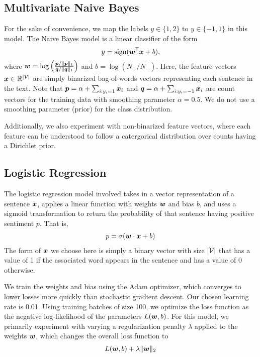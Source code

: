 \documentclass[11pt]{article}
\begin{document}
\subsection{Multivariate Naive Bayes}
For the sake of convenience, we map the labels $y\in\{1, 2\}$ to $y\in\{-1, 1\}$ in this model. The Naive Bayes model is a linear classifier of the form
\[
y = \text{sign}(\boldsymbol{w}^{\mathsf{T}} \boldsymbol{x} + b),
\]
where $\boldsymbol{w} = \log\left(\frac{\boldsymbol{p} / \lVert\boldsymbol{p}\rVert_1}{\boldsymbol{q} / \lVert\boldsymbol{q}\rVert_1}\right)$ and $b = \log(N_+ / N_-)$. Here, the feature vectors $\boldsymbol{x}\in\mathbb{R}^{\lvert \mathcal{V}\rvert}$ are simply binarized bag-of-words vectors representing each sentence in the text. Note that $\boldsymbol{p} = \alpha + \sum_{i: y_i = 1} \boldsymbol{x}_i$ and $\boldsymbol{q} = \alpha + \sum_{i: y_i = -1} \boldsymbol{x}_i$ are count vectors for the training data with smoothing parameter $\alpha = 0.5$. We do not use a smoothing parameter (prior) for the class distribution.

Additionally, we also experiment with non-binarized feature vectors, where each feature can be understood to follow a catergorical distribution over counts having a Dirichlet prior.

\subsection{Logistic Regression}
The logistic regression model involved takes in a vector representation of a sentence $\boldsymbol{x}$, applies a linear function with weights $\boldsymbol{w}$ and bias $b$, and uses a sigmoid transformation to return the probability of that sentence having positive sentiment $p$.  That is,
\begin{align*}
p = \sigma(\boldsymbol{w} \cdot \boldsymbol{x} + b)
\end{align*}
The form of $\boldsymbol{x}$ we choose here is simply a binary vector with size $\lvert \mathcal{V} \rvert$ that has a value of 1 if the associated word appears in the sentence and has a value of 0 otherwise.

We train the weights and bias using the Adam optimizer, which converges to lower losses more quickly than stochastic gradient descent.  Our chosen learning rate is 0.01.  Using training batches of size 100, we optimize the loss function as the negative log-likelihood of the parameters $L(\boldsymbol{w}, b)$.  For this model, we primarily experiment with varying a regularization penalty $\lambda$ applied to the weights $\boldsymbol{w}$, which changes the overall loss function to 
\begin{align*}
L(\boldsymbol{w}, b) + \lambda \| \boldsymbol{w} \|_2
\end{align*}
\end{document}
